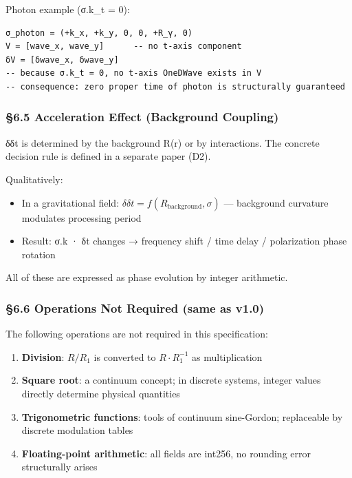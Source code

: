 \documentclass[a4paper,11pt]{article}
\providecommand{\tightlist}{\setlength{\itemsep}{0pt}\setlength{\parskip}{0pt}}
\begin{document}
Photon example (σ.k\_t = 0):

\begin{verbatim}
σ_photon = (+k_x, +k_y, 0, 0, +R_γ, 0)
V = [wave_x, wave_y]      -- no t-axis component
δV = [δwave_x, δwave_y]
-- because σ.k_t = 0, no t-axis OneDWave exists in V
-- consequence: zero proper time of photon is structurally guaranteed
\end{verbatim}

\subsubsection{§6.5 Acceleration Effect (Background
Coupling)}\label{acceleration-effect-background-coupling}

δδt is determined by the background R(r) or by interactions. The
concrete decision rule is defined in a separate paper (D2).

Qualitatively:

\begin{itemize}
\tightlist
\item
  In a gravitational field:
  \(\delta\delta t = f(R_{\text{background}}, \sigma)\) --- background
  curvature modulates processing period
\item
  Result: σ.k · δt changes → frequency shift / time delay / polarization
  phase rotation
\end{itemize}

All of these are expressed as phase evolution by integer arithmetic.

\subsubsection{§6.6 Operations Not Required (same as
v1.0)}\label{operations-not-required-same-as-v1.0}

The following operations are not required in this specification:

\begin{enumerate}
\def\labelenumi{\arabic{enumi}.}
\tightlist
\item
  \textbf{Division}: \(R/R_1\) is converted to \(R \cdot R_1^{-1}\) as
  multiplication
\item
  \textbf{Square root}: a continuum concept; in discrete systems,
  integer values directly determine physical quantities
\item
  \textbf{Trigonometric functions}: tools of continuum sine-Gordon;
  replaceable by discrete modulation tables
\item
  \textbf{Floating-point arithmetic}: all fields are int256, no rounding
  error structurally arises
\end{enumerate}
\end{document}
